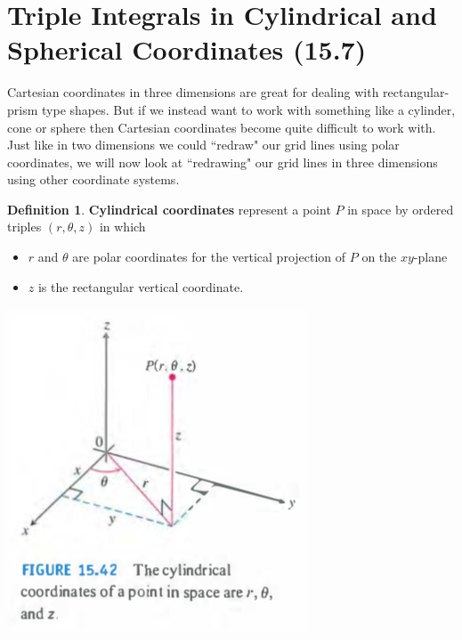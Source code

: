 \documentclass[12pt, letter]{article}
\theoremstyle{plain}
\numberwithin{theorem}{section}
\theoremstyle{definition}
\newtheorem{definition}[theorem]{Definition}
\begin{document}
\newpage


\section{Triple Integrals in Cylindrical and Spherical Coordinates (15.7)}

Cartesian coordinates in three dimensions are great for dealing with rectangular-prism type shapes. But if we instead want to work with something like a cylinder, cone or sphere then Cartesian coordinates become quite difficult to work with. Just like in two dimensions we could ``redraw" our grid lines using polar coordinates, we will now look at ``redrawing" our grid lines in three dimensions using other coordinate systems.

\bigskip

\hrulefill

\bigskip

\begin{definition}
\textbf{Cylindrical coordinates} represent a point $P$ in space by ordered triples $(r,\theta,z)$ in which
\begin{itemize}
\item[1.] $r$ and $\theta$ are polar coordinates for the vertical projection of $P$ on the $xy$-plane
\item[2.] $z$ is the rectangular vertical coordinate.
\end{itemize}
\end{definition}

\bigskip

\begin{center}
\includegraphics[scale=0.7]{m3_f18}
\end{center}
\end{document}
